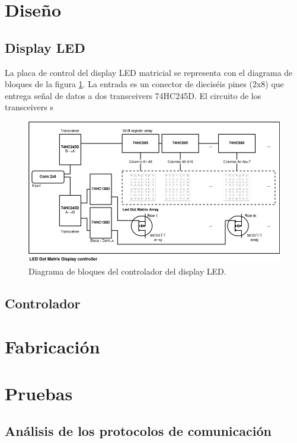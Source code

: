 \documentclass[
11pt, %
]{charter}
\begin{document}
\pagebreak

\section{Diseño}

\subsection{Display LED}
La placa de control del display LED matricial se representa con el diagrama de bloques de la figura \ref{fig:blockDiagram LED display}. La entrada es un conector de dieciséis pines (2x8) que entrega señal de datos a dos transceivers 74HC245D. El circuito de los transceivers s

\begin{figure}[htpb]
\centering 
\includegraphics[width=1\textwidth]{./Pics/blockDiagram.png}
\caption{Diagrama de bloques del controlador del display LED.}
\label{fig:blockDiagram LED display}
\end{figure}

\subsection{Controlador}

\section{Fabricación}
\section{Pruebas}
\subsection{Análisis de los protocolos de comunicación}
\end{document}
